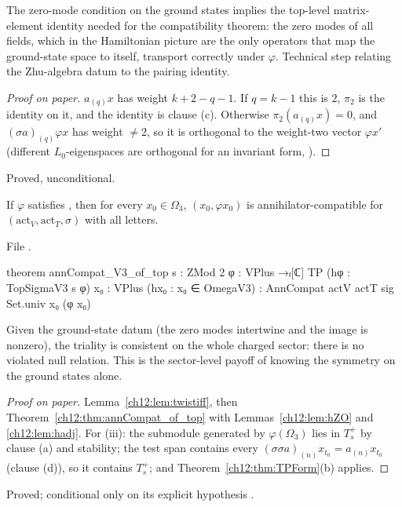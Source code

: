 \begin{physics}
The zero-mode condition on the ground states implies the top-level matrix-element identity needed for the compatibility theorem: the zero modes of all fields, which in the Hamiltonian picture are the only operators that map the ground-state space to itself, transport correctly under $\varphi$. Technical step relating the Zhu-algebra datum to the pairing identity.
\end{physics}
\begin{proof}[Proof on paper]
$a_{(q)}x$ has weight $k+2-q-1$.  If $q=k-1$ this is $2$, $\pi_2$ is the identity on it, and the
identity is clause (c).  Otherwise $\pi_2(a_{(q)}x)=0$, and $(\sigma a)_{(q)}\varphi x$ has weight
$\neq2$, so it is orthogonal to the weight-two vector $\varphi x'$ (different $L_0$-eigenspaces are
orthogonal for an invariant form, ).
\end{proof}
\begin{status}Proved, unconditional.\end{status}

\begin{theorem}\label{ch12:thm:annCompatV3}
If $\varphi$ satisfies , then for every $x_0\in\Omega_3$, $(x_0,\varphi x_0)$ is
annihilator-compatible for $(\mathrm{act}_V,\mathrm{act}_T,\sigma)$ with all letters.
\end{theorem}
File .
\begin{leancode}
theorem annCompat_V3_of_top {s : ZMod 2} {φ : VPlus →ₗ[ℂ] TP} (hφ : TopSigmaV3 s φ) {x₀ : VPlus}
    (hx₀ : x₀ ∈ OmegaV3) : AnnCompat actV actT sig Set.univ x₀ (φ x₀)
\end{leancode}

\begin{physics}
Given the ground-state datum (the zero modes intertwine and the image is nonzero), the triality is consistent on the whole charged sector: there is no violated null relation. This is the sector-level payoff of knowing the symmetry on the ground states alone.
\end{physics}
\begin{proof}[Proof on paper]
Lemma~\ref{ch12:lem:twistiff}, then Theorem~\ref{ch12:thm:annCompat_of_top} with
Lemmas~\ref{ch12:lem:hZO} and \ref{ch12:lem:hadj}.  For (iii): the submodule generated by
$\varphi(\Omega_3)$ lies in $T_s^+$ by clause (a) and stability; the test span contains every
$(\sigma\sigma a)_{(n)}x_{t_0}=a_{(n)}x_{t_0}$ (clause (d)), so it contains $T_s^+$; and
Theorem~\ref{ch12:thm:TPForm}(b) applies.
\end{proof}
\begin{status}Proved; conditional only on its explicit hypothesis .\end{status}

